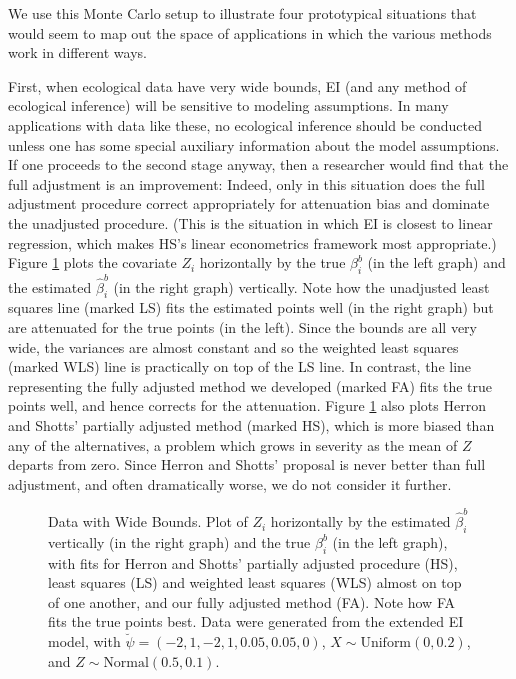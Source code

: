 \documentclass[11pt,titlepage]{article}
\begin{document}
We use this Monte Carlo setup to illustrate four prototypical
situations that would seem to map out the space of applications in
which the various methods work in different ways.

First, when ecological data have very wide bounds, EI (and any method
of ecological inference) will be sensitive to modeling assumptions.
In many applications with data like these, no ecological inference
should be conducted unless one has some special auxiliary information
about the model assumptions.  If one proceeds to the second stage
anyway, then a researcher would find that the full adjustment is an
improvement: Indeed, only in this situation does the full adjustment
procedure correct appropriately for attenuation bias and dominate the
unadjusted procedure.  (This is the situation in which EI is closest
to linear regression, which makes HS's linear econometrics framework
most appropriate.)  Figure \ref{f:wide} plots the covariate $Z_i$
horizontally by the true $\beta_i^b$ (in the left graph) and the
estimated $\hat\beta_i^b$ (in the right graph) vertically.  Note how
the unadjusted least squares line (marked LS) fits the estimated
points well (in the right graph) but are attenuated for the true
points (in the left).  Since the bounds are all very wide, the
variances are almost constant and so the weighted least squares
(marked WLS) line is practically on top of the LS line.  In contrast,
the line representing the fully adjusted method we developed (marked
FA) fits the true points well, and hence corrects for the attenuation.
Figure \ref{f:wide} also plots Herron and Shotts' partially adjusted
method (marked HS), which is more biased than any of the
alternatives, a problem which grows in severity as the mean of $Z$
departs from zero.  Since Herron and Shotts' proposal is never better
than full adjustment, and often dramatically worse, we do not consider
it further.
\begin{figure}[t]
  \begin{center}
    \caption{Data with Wide Bounds. Plot of $Z_i$ horizontally by
      the estimated $\hat\beta_i^b$ vertically (in the right graph)
      and the true $\beta_i^b$ (in the left graph), with fits for
      Herron and Shotts' partially adjusted procedure (HS), least
      squares (LS) and weighted least squares (WLS) almost on top of
      one another, and our fully adjusted method (FA).  Note how FA
      fits the true points best.  Data were generated from the
      extended EI model, with $\breve\psi=(-2,1,-2,1,0.05,0.05,0)$, $X
      \sim \textrm{Uniform}(0,0.2)$, and $Z \sim
      \textrm{Normal}(0.5,0.1)$.}
    \label{f:wide}
  \end{center}
\end{figure}
\end{document}
